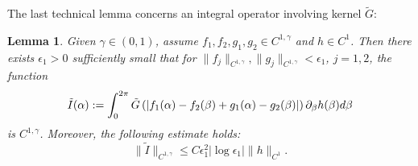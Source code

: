 \documentclass[11pt,reqno]{amsproc}
\newtheorem{lemma}{Lemma}
\newcommand{\eps}{\epsilon}
\newcommand{\p}{\partial}
\newcommand{\pb}{\p_\beta}
\begin{document}
The last technical lemma concerns an integral operator involving kernel $\tilde G$:
\begin{lemma}\label{lem:tGintegral}
    Given $\gamma \in (0,1)$, assume $f_1, f_2, g_1, g_2\in C^{1,\gamma}$ and $h \in C^1$. Then there exists $\eps_1 > 0$ sufficiently small that for $\|f_j\|_{C^{1,\gamma}}, \|g_j\|_{C^{1,\gamma}} < \eps_1$, $j = 1,2$, the function
    \begin{equation}
        \label{eq:tGintegral}
        \tilde I(\alpha) := \int_0^{2\pi} \Tilde{G}\left(|f_1(\alpha) - f_2(\beta) + g_1(\alpha) - g_2(\beta)|\right)  \pb h(\beta) d\beta
    \end{equation}
    is $C^{1,\gamma}$. Moreover, the following estimate holds:
    \begin{equation}
        \label{est:tGintegral}
        \|\tilde I\|_{C^{1,\gamma}} \le C\eps_1^2 |\log\eps_1| \|h\|_{C^1}.
    \end{equation}
\end{lemma}
\end{document}
